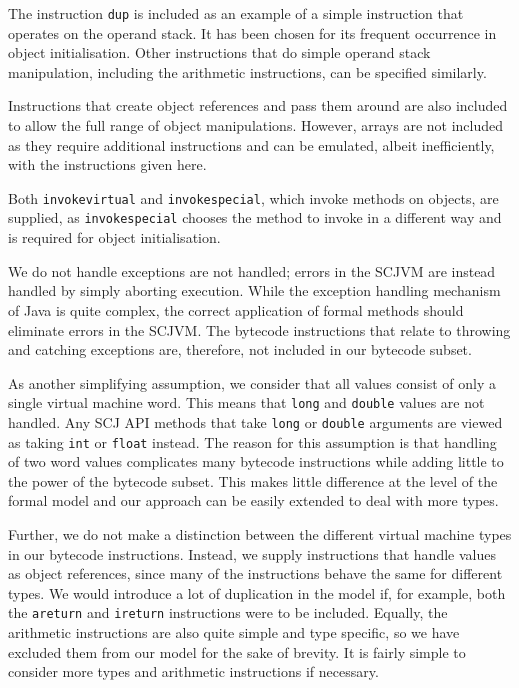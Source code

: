 The instruction \texttt{dup} is included as an example of a simple
instruction that operates on the operand stack.
It has been chosen for its frequent occurrence in object initialisation.
Other instructions that do simple operand stack manipulation,
including the arithmetic instructions, can be specified similarly.

Instructions that create object references and pass them around are
also included to allow the full range of object manipulations.
However, arrays are not included as they require additional
instructions and can be emulated, albeit inefficiently, with the
instructions given here.

Both \texttt{invokevirtual} and \texttt{invokespecial}, which invoke
methods on objects, are supplied, as \texttt{invokespecial} chooses
the method to invoke in a different way and is required for object
initialisation.

We do not handle exceptions are not handled; errors in the SCJVM are
instead handled by simply aborting execution.
While the exception handling mechanism of Java is quite complex, the
correct application of formal methods should eliminate errors in the
SCJVM.
The bytecode instructions that relate to throwing and catching
exceptions are, therefore, not included in our bytecode subset.

As another simplifying assumption, we consider that all values consist
of only a single virtual machine word.
This means that \texttt{long} and \texttt{double} values are not
handled.
Any SCJ API methods that take \texttt{long} or \texttt{double}
arguments are viewed as taking \texttt{int} or \texttt{float} instead.
The reason for this assumption is that handling of two word values
complicates many bytecode instructions while adding little to the
power of the bytecode subset.
This makes little difference at the level of the formal model and our
approach can be easily extended to deal with more types.

Further, we do not make a distinction between the different virtual
machine types in our bytecode instructions.
Instead, we supply instructions that handle values as object
references, since many of the instructions behave the same for
different types.
We would introduce a lot of duplication in the model if, for example,
both the \texttt{areturn} and \texttt{ireturn} instructions were to be
included.
Equally, the arithmetic instructions are also quite simple and type
specific, so we have excluded them from our model for the sake of
brevity.
It is fairly simple to consider more types and arithmetic instructions
if necessary.

